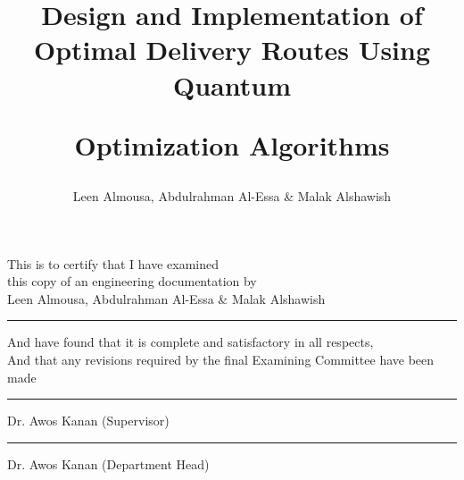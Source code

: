 \documentclass[a4paper]{report}
\begin{document}
\title{Design and Implementation of Optimal Delivery Routes Using Quantum

Optimization Algorithms} %
\author{Leen Almousa, Abdulrahman Al-Essa \&   
Malak Alshawish} %
\degree{\bsc}{\majorce}
\doctype{\SDP} %

\supervisoruni{\psut}

    

\beforepreface




\newpage
\begin{center}
    This is to certify that I have examined\\
    \vspace{0.2in}
    this copy of an engineering documentation by\\
    \vspace{0.2in}
    Leen Almousa, Abdulrahman Al-Essa \&   
Malak Alshawish\\
    \vspace{0.1in}
    \hrule
    \vspace{1in}    
    And have found that it is complete and satisfactory in all respects,\\
And that any revisions required by the final Examining Committee have been made\\
    \vspace{1in}    
    \hrule
    \vspace{0.2in}    
    Dr. Awos Kanan (Supervisor)
     \vspace{1in}    
    \hrule
    \vspace{0.2in}    
    Dr. Awos Kanan (Department Head)
\end{center}
\end{document}
